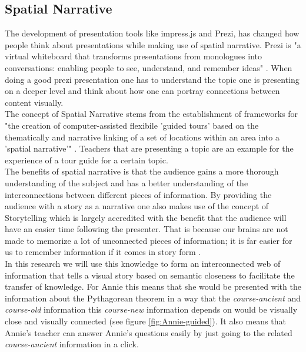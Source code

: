 \documentclass[twoside, 12pt]{article}
\begin{document}
\subsection{Spatial Narrative}
\label{sec:spatialnarrative}

The development of presentation tools like impress.js and Prezi, has changed how people think about presentations while making use of spatial narrative. Prezi is "a virtual whiteboard that transforms presentations from monologues into conversations: enabling people to see, understand, and remember ideas" \cite{Prezi:npentrel14}. When doing a good prezi presentation one has to understand the topic one is presenting on a deeper level and think about how one can portray connections between content visually.\\

The concept of Spatial Narrative stems from the establishment of frameworks for "the creation of computer-assisted flexibile 'guided tours' based on the thematically and narrative linking of a set of locations within an area into a 'spatial narrative'" \cite{SpatialNarratives:npentrel14}. Teachers that are presenting a topic are an example for the experience of a tour guide for a certain topic.\\

The benefits of spatial narrative is that the audience gains a more thorough understanding of the subject and has a better understanding of the interconnections between different pieces of information. By providing the audience with a story as a narrative one also makes use of the concept of Storytelling which is largely accredited with the benefit that the audience will have an easier time following the presenter. That is because our brains are not made to memorize a lot of unconnected pieces of information; it is far easier for us to remember information if it comes in story form \cite{Storytelling:npentrel14}.\\

In this research we will use this knowledge to form an interconnected web of information that tells a visual story based on semantic closeness to facilitate the transfer of knowledge. For Annie this means that she would be presented with the information about the Pythagorean theorem in a way that the \textit{course-ancient} and \textit{course-old} information this \textit{course-new} information depends on would be visually close and visually connected (see figure \ref{fig:Annie-guided}). It also means that Annie's teacher can answer Annie's questions easily by just going to the related \textit{course-ancient} information in a click.\\
\end{document}
